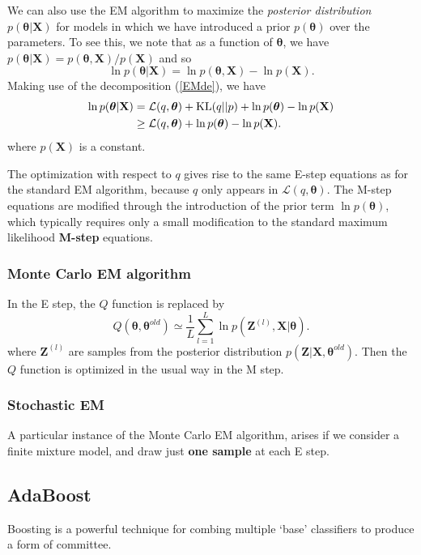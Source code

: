\documentclass[a4paper]{book}
\newcommand{\up}{\mathrm}
\renewcommand{\bf}{\mathbf}
\renewcommand{\cal}{\mathcal}
\newcommand{\imp}[1]{\textit{#1}}
\newcommand{\bs}{\boldsymbol}
\begin{document}
We can also use the EM algorithm to maximize the \imp{posterior distribution} $p(\bs{\theta|}\bf{X})$ for models in which we have introduced a prior $p(\bs{\theta})$ over the parameters. To see this, we note that as a function of $\bs{\theta}$, we have $p(\bs{\theta}|\bf{X}) = p(\bs{\theta},\bf{X})/p(\bf{X})$ and so
\begin{equation}
	\ln p(\bs{\theta|}\bf{X}) = \ln p(\bs{\theta},\bf{X}) - \ln p(\bf{X}).
\end{equation}
Making use of the decomposition (\ref{EMde}), we have
\begin{align}
	\ln p(\bs{\theta}|\bf{X}) &= \cal{L}(q,\bs{\theta})+\up{KL}(q||p)+\ln p(\bs{\theta}) - \ln p(\bf{X}) \notag \\
	& \geq \cal{L}(q, \bs{\theta}) + \ln p(\bs{\theta}) - \ln p(\bf{X}).
\end{align}
where $p(\bf{X})$ is a constant.

The optimization with respect to $q$ gives rise to the same E-step equations as for the standard EM algorithm, because $q$ only appears in $\cal{L}(q,\bs{\theta})$. The M-step equations are modified through the introduction of the prior term $\ln p(\bs{\theta})$, which typically requires only a small modification to the standard maximum likelihood \textbf{M-step} equations.

\subsubsection{Monte Carlo EM algorithm}
In the E step, the $Q$ function is replaced by 
\begin{equation}
	Q(\bs{\theta},\bs{\theta}^{old}) \simeq \frac{1}{L} \sum_{l=1}^L \ln p(\bf{Z}^{(l)},\bf{X}|\bs{\theta}).
\end{equation}
where $\bf{Z}^{(l)}$ are samples from the posterior distribution $p(\bf{Z|X},\bs{\theta}^{old})$. Then the $Q$ function is optimized in the usual way in the M step.
\subsubsection{Stochastic EM}
A particular instance of the Monte Carlo EM algorithm, arises if we consider a finite mixture model, and draw just \textbf{one sample} at each E step.
\subsection{AdaBoost}\label{AdaBoost}
Boosting is a powerful technique for combing multiple `base' classifiers to produce a form of committee.
\end{document}
